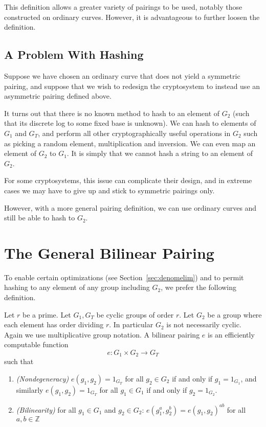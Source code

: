 This definition allows a greater variety of pairings to be used,
notably those constructed on ordinary curves.
However, it is advantageous to further loosen the
definition.

\subsection{A Problem With Hashing}

Suppose we have chosen an ordinary curve that does not yield a symmetric
pairing, and suppose that we wish to redesign
the cryptosystem to instead use an asymmetric pairing defined above.

It turns out that there is no
known method to hash to an element of $G_2$ (such that
its discrete log to some fixed base is unknown). We can hash to elements of
$G_1$ and $G_T$, and perform all other cryptographically useful
operations in $G_2$ such as picking a random element, multiplication
and inversion. We can even map an element of $G_2$ to $G_1$.
It is simply that we cannot hash a string
to an element of $G_2$.

For some cryptosystems, this issue can complicate their design,
and in extreme cases we may have to give up and stick to symmetric pairings
only.

However, with a more general pairing definition, we can use ordinary curves
and still be able to hash to $G_2$.

\section{\label{sec:generalpairing}The General Bilinear Pairing}

To enable certain optimizations (see Section~\ref{sec:denomelim}) and
to permit hashing to any element of any group including $G_2$,
we prefer the following definition.

Let $r$ be a prime.
Let $G_1, G_T$ be cyclic groups of order $r$.
Let $G_2$ be a group where each element has order dividing $r$.
In particular $G_2$ is not necessarily cyclic.
Again we use multiplicative group notation.
A bilinear pairing $e$ is an efficiently computable function
\[
e:G_1 \times G_2 \rightarrow G_T
\]
such that
\begin{enumerate}
\item
\emph{(Nondegeneracy)}
$e(g_1,g_2) = 1_{G_T}$ for all $g_2 \in G_2$ if and only if $g_1 = 1_{G_1}$,
and similarly 
$e(g_1,g_2) = 1_{G_T}$ for all $g_1 \in G_1$ if and only if $g_2 = 1_{G_2}$.
\item
\emph{(Bilinearity)}
for all $g_1 \in G_1$ and $g_2 \in G_2$:
$e(g_1^a, g_2^b) = e(g_1,g_2)^{a b}$ for all $a, b \in \mathbb{Z}$
\end{enumerate}

